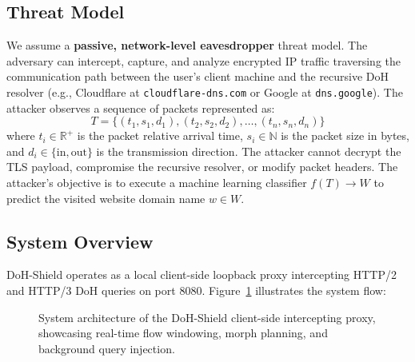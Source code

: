 \documentclass[10pt,journal,compsoc,twocolumn]{IEEEtran}
\begin{document}
\subsection{Threat Model}
We assume a \textbf{passive, network-level eavesdropper} threat model. The adversary can intercept, capture, and analyze encrypted IP traffic traversing the communication path between the user's client machine and the recursive DoH resolver (e.g., Cloudflare at \texttt{cloudflare-dns.com} or Google at \texttt{dns.google}). The attacker observes a sequence of packets represented as:
\begin{equation}
T = \{(t_1, s_1, d_1), (t_2, s_2, d_2), \dots, (t_n, s_n, d_n)\}
\end{equation}
where $t_i \in \mathbb{R}^+$ is the packet relative arrival time, $s_i \in \mathbb{N}$ is the packet size in bytes, and $d_i \in \{\text{in}, \text{out}\}$ is the transmission direction. The attacker cannot decrypt the TLS payload, compromise the recursive resolver, or modify packet headers. The attacker's objective is to execute a machine learning classifier $f(T) \to W$ to predict the visited website domain name $w \in W$.

\subsection{System Overview}
DoH-Shield operates as a local client-side loopback proxy intercepting HTTP/2 and HTTP/3 DoH queries on port 8080. Figure~\ref{fig:architecture} illustrates the system flow:

\begin{figure}[t]
\centering
{}
\caption{System architecture of the DoH-Shield client-side intercepting proxy, showcasing real-time flow windowing, morph planning, and background query injection.}
\label{fig:architecture}
\end{figure}
\end{document}
